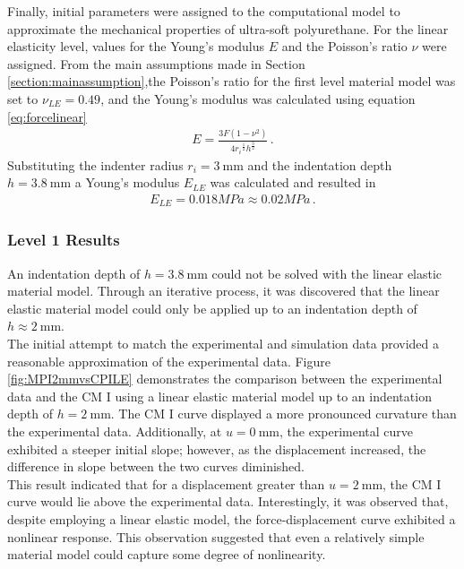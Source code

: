 Finally, initial parameters were assigned to the computational model to approximate the mechanical properties of ultra-soft polyurethane. 
For the linear elasticity level, values for the Young's modulus $E$ and the Poisson's ratio $\nu$ were assigned. 
From the main assumptions made in Section \ref{section:mainassumption},the Poisson's ratio for the first 
level material model was set to $\nu_{LE} =  0.49$, and the Young's modulus was calculated using equation \ref{eq:forcelinear}
\begin{align}
    E = \frac{3F(1-\nu^2)} {4{r_i}^{\frac{1}{2}} {h}^{\frac{3}{2}}}\, .
    \label{eq:forcelinearcp1}
\end{align}
Substituting the indenter radius $r_i = \SI{3}{\milli \meter}$ and the indentation depth $h = \SI{3.8}{\milli \meter}$ a Young's modulus $E_{LE}$ was calculated and resulted in 
\begin{align}
    E_{LE} = 0.018 MPa \approx 0.02 MPa \, .
    \label{eq:Elinearcp1}
\end{align}


\subsubsection*{Level 1 Results}
An indentation depth of $h = \SI{3.8}{\milli \meter}$ could not be solved with the linear elastic material model. 
Through an iterative process, it was discovered that the linear elastic material model could only be applied 
up to an indentation depth of $h \approx \SI{2}{\milli \meter}$.\\

The initial attempt to match the experimental and simulation data provided a reasonable approximation of the experimental data.
Figure \ref{fig:MPI2mmvsCPILE} demonstrates the comparison between the experimental data and the CM I using a 
linear elastic material model up to an indentation depth of $h = \SI{2}{\milli \meter}$. The CM I curve displayed 
a more pronounced curvature than the experimental data. Additionally, at $u =\SI{0}{\milli \meter}$, 
the experimental curve exhibited a steeper initial slope; however, as the displacement increased, the 
difference in slope between the two curves diminished.\\

This result indicated that for a displacement greater than $u = \SI{2}{\milli \meter}$, the CM I curve would 
lie above the experimental data. Interestingly, it was observed that, despite employing a linear elastic model, 
the force-displacement curve exhibited a nonlinear response. This observation suggested that even a relatively 
simple material model could capture some degree of nonlinearity. 

